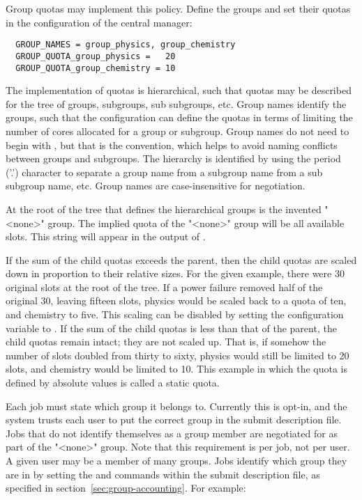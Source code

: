 Group quotas may implement this policy.
Define the groups and set their quotas in the 
configuration of the central manager:

\begin{verbatim}
  GROUP_NAMES = group_physics, group_chemistry
  GROUP_QUOTA_group_physics =   20
  GROUP_QUOTA_group_chemistry = 10
\end{verbatim}

The implementation of quotas is hierarchical, 
such that quotas may be described for the tree of groups, subgroups, 
sub subgroups, etc.
Group names identify the groups,  
such that the configuration can define the quotas in terms of 
limiting the number of cores allocated for a group or subgroup. 
Group names do not need to begin with , 
but that is the convention, 
which helps to avoid naming conflicts between groups and subgroups.  
The hierarchy is identified by using the period ('.') character to 
separate a group name from a subgroup name from a sub subgroup name, etc.
Group names are case-insensitive for negotiation.

At the root of the tree that defines the hierarchical groups is the
invented "<none>" group. 
The implied quota of the "<none>" group will be all available slots.
This string will appear in the output of . 

If the sum of the child quotas exceeds the parent, 
then the child quotas are scaled down in proportion to their relative sizes.
For the given example, 
there were 30 original slots at the root of the tree.
If a power failure removed half of the original 30,
leaving fifteen slots,
physics would be scaled back to a quota of ten, 
and chemistry to five.  
This scaling can be disabled by setting the 
configuration variable 
to .
If the sum of the child quotas is less than that of the parent, 
the child quotas remain intact; they are not scaled up.
That is, if somehow the number of slots doubled from thirty to sixty, 
physics would still be limited to 20 slots, 
and chemistry would be limited to 10.
This example in which the quota is defined by absolute
values is called a static quota.

Each job must state which group it belongs to.  
Currently this is opt-in, 
and the system trusts each user to put the correct group 
in the submit description file.
Jobs that do not identify themselves as a group member are 
negotiated for as part of the  "<none>" group.
Note that this requirement is per job, not per user.  
A given user may be a member of many groups.
Jobs identify which group they are in by setting the 
and  commands within
the submit description file, 
as specified in section~\ref{sec:group-accounting}.
For example:

